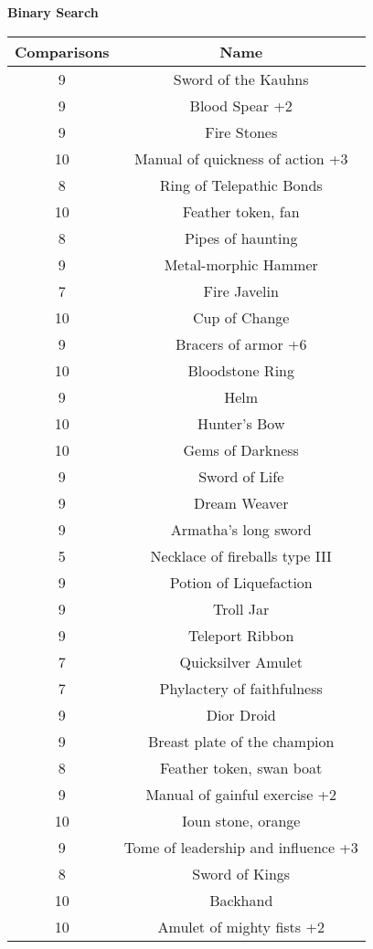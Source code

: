 \documentclass[letterpaper, 10pt]{article}
\begin{document}
\begin{center}
    \bf{Binary Search}\\
    \begin{tabular}{|| c c ||}
    \hline
    \bf{Comparisons} & \bf{Name} \\
    \hline
    9  & Sword of the Kauhns\\
    9  & Blood Spear +2\\
    9  & Fire Stones\\
    10 & Manual of quickness of action +3\\
    8  & Ring of Telepathic Bonds\\
    10 & Feather token, fan\\
    8  & Pipes of haunting\\
    9  & Metal-morphic Hammer\\
    7  & Fire Javelin\\
    10 & Cup of Change\\
    9  & Bracers of armor +6\\
    10 & Bloodstone Ring\\
    9  & Helm\\
    10 & Hunter's Bow\\
    10 & Gems of Darkness\\
    9  & Sword of Life\\
    9  & Dream Weaver\\
    9  & Armatha's long sword\\
    5  & Necklace of fireballs type III\\
    9  & Potion of Liquefaction\\
    9  & Troll Jar\\
    9  & Teleport Ribbon\\
    7  & Quicksilver Amulet\\
    7  & Phylactery of faithfulness\\
    9  & Dior Droid\\
    9  & Breast plate of the champion\\
    8  & Feather token, swan boat\\
    9  & Manual of gainful exercise +2\\
    10 & Ioun stone, orange\\
    9  & Tome of leadership and influence +3\\
    8  & Sword of Kings\\
    10 & Backhand\\
    10 & Amulet of mighty fists +2\\

\end{tabular}
\end{center}
\end{document}

